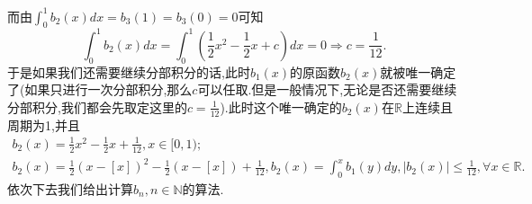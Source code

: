 \documentclass[../../main.tex]{subfiles}
\begin{document}
\begin{remark}
而由\(\int_{0}^{1}b_2(x)dx =b_3(1)=b_3(0)= 0\)可知
\[
\int_{0}^{1}b_2(x)dx=\int_{0}^{1}\left(\frac{1}{2}x^2-\frac{1}{2}x + c\right)dx = 0\Rightarrow c=\frac{1}{12}.
\]
于是如果我们还需要继续分部积分的话,此时$b_1(x)$的原函数\(b_2(x)\)就被唯一确定了(如果只进行一次分部积分,那么$c$可以任取.但是一般情况下,无论是否还需要继续分部积分,我们都会先取定这里的$c=\frac{1}{12}$).此时这个唯一确定的$b_2(x)$在$\mathbb{R}$上连续且周期为1,\hypertarget{b2性质}{并且}
\begin{gather*}
b_2(x)=\frac{1}{2}x^2-\frac{1}{2}x + \frac{1}{12},x\in[0,1);
\\
b_2(x)=\frac{1}{2}\left( x-\left[ x \right] \right) ^2-\frac{1}{2}\left( x-\left[ x \right] \right) +\frac{1}{12},b_2\left( x \right) =\int_0^x{b_1\left( y \right) dy},\left| b_2\left( x \right) \right|\leqslant \frac{1}{12},\forall x\in \mathbb{R}.
\end{gather*}
依次下去我们给出计算\(b_n,n\in\mathbb{N}\)的算法.
\end{remark}
\end{document}
